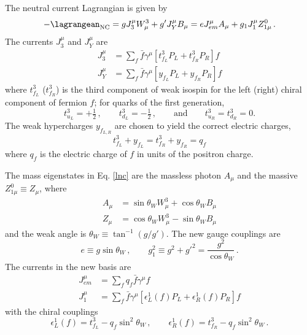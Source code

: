 The neutral current Lagrangian is given by
\begin{equation}
-\lagrangean_{\text{NC}} = gJ_3^\mu W_\mu^3 + g'J_Y^\mu B_\mu = eJ_{em}^\mu A_\mu + g_1J_1^\mu Z_{1\mu}^0\,. \label{lnc}
\end{equation}
The currents $J_3^\mu$ and $J_Y^\mu$ are
\begin{align}
J_3^\mu &= \sum_{f}\bar{f}\gamma^\mu [t_{f_L}^3P_L+t_{f_R}^3P_R]f \\
J_Y^\mu &= \sum_{f}\bar{f}\gamma^\mu [y_{f_L}  P_L+y_{f_R}  P_R]f 
\end{align}
where $t_{f_L}^3$ ($t_{f_R}^3$) is the third component of weak isospin for the left (right) chiral component of fermion $f$; for quarks of the first generation, 
\begin{equation}
t_{u_L}^3=+\tfrac{1}{2}\,,\qquad t_{d_L}^3=-\tfrac{1}{2}\,,\qquad \text{and}\qquad t_{u_R}^3=t_{d_R}^3=0. 
\end{equation}
The weak hypercharges $y_{f_{L,R}}$ are chosen to yield the correct electric charges,
\begin{equation}
t_{f_L}^3 + y_{f_L} = t_{f_R}^3 + y_{f_R} = q_{f}
\end{equation}
where $q_f$ is the electric charge of $f$ in units of the positron charge. 

The mass eigenstates in Eq. \ref{lnc} are the massless photon $A_\mu$ and the massive $Z_{1\mu}^0 \equiv Z_\mu$, where
\begin{align}
A_\mu &= \sin\theta_W W_\mu^3 + \cos\theta_W B_\mu \label{foton}\\
Z_\mu &= \cos\theta_W W_\mu^3 - \sin\theta_W B_\mu 
\end{align}
and the weak angle is $\theta_W \equiv \tan^{-1}(g/g')$. The new gauge couplings are
\begin{equation}
e \equiv g\sin\theta_W \,, \qquad g_1^2 \equiv g^2+g'^2=\frac{g^2}{\cos\theta_W} \,. \label{Zqqcoup}
\end{equation}
The currents in the new basis are
\begin{align}
J_{em}^\mu &= \sum_{f}q_f\bar{f}\gamma^\mu f \\
J_1^\mu &= \sum_{f}\bar{f}\gamma^\mu [\epsilon_L^1(f) P_L + \epsilon_R^1(f)  P_R]f 
\end{align}
with the chiral couplings
\begin{equation}
\epsilon_L^1(f)=t_{f_L}^3-q_f\sin^2\theta_W \,,\qquad \epsilon_R^1(f)=t_{f_R}^3-q_f\sin^2\theta_W \,. \label{Chiralcoup}
\end{equation}

